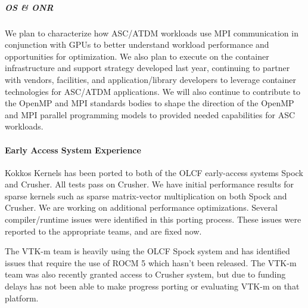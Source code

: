 \subparagraph{OS \& ONR} We plan to characterize how ASC/ATDM workloads use MPI communication in conjunction with GPUs to better understand workload performance and opportunities for optimization. We also plan to execute on the container infrastructure and support strategy developed last year, continuing to partner with vendors, facilities, and application/library developers to leverage container technologies for ASC/ATDM applications. We will also continue to contribute to the OpenMP and MPI standards bodies to shape the direction of the OpenMP and MPI parallel programming models to provided needed capabilities for ASC workloads.

\paragraph{Early Access System Experience} %

Kokkos Kernels has been ported to both of the OLCF early-access systems Spock and Crusher. All tests pass on Crusher. We have initial performance results for sparse kernels such as sparse matrix-vector multiplication on both Spock and Crusher. We are working on additional performance optimizations. Several compiler/runtime issues were identified in this porting process.  These issues were reported to the appropriate teams, and are fixed now.

The VTK-m team is heavily using the OLCF Spock system and has identified issues that require the use of ROCM 5 which hasn’t been released. The VTK-m team was also recently granted access to Crusher system, but due to funding delays has not been able to make progress porting or evaluating VTK-m on that platform.


